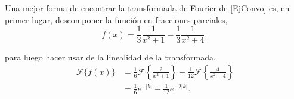 \begin{ejemplo}
Una mejor forma de encontrar la transformada de Fourier de \eqref{EjConvo} es, en primer lugar, descomponer la función en fracciones parciales,
$$f(x) = \frac{1}{3} \frac{1}{x^2+1} - \frac{1}{3} \frac{1}{x^2+4},$$

para luego hacer usar de la linealidad de la transformada.
\begin{align*}
     \mathcal{F}\{ f(x)\} &= \frac{1}{6} \mathcal{F} \left\{ \frac{2}{x^2+1}\right\} - \frac{1}{12} \mathcal{F} \left\{ \frac{4}{x^2+4} \right\}  \\
     &= \frac{1}{6} e^{-|k|} - \frac{1}{12} e^{-2|k|}.
\end{align*}

\end{ejemplo}








    

